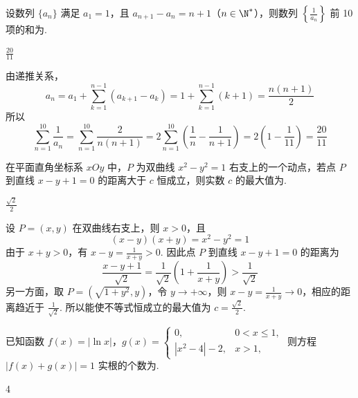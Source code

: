 \begin{problem}
设数列 \(\{a_n\}\) 满足 \(a_1 = 1\)，且 \(a_{n+1} - a_n = n + 1\)（\(n \in \N^*\)），则数列 \(\left\{\frac{1}{a_n}\right\}\) 前 10 项的和为\fillinblank{}.
\end{problem}

\begin{answer}
\(\frac{20}{11}\)
\end{answer}

\begin{solution}
由递推关系，
\[
a_n=a_1+\sum_{k=1}^{n-1}(a_{k+1}-a_k)=1+\sum_{k=1}^{n-1}(k+1)=\frac{n(n+1)}{2}
\]
所以
\[
\sum_{n=1}^{10}\frac{1}{a_n}=\sum_{n=1}^{10}\frac{2}{n(n+1)}=2\sum_{n=1}^{10}\left(\frac1n-\frac1{n+1}\right)=2\left(1-\frac1{11}\right)=\frac{20}{11}
\]
\end{solution}

\begin{problem}
在平面直角坐标系 \(xOy\) 中，\(P\) 为双曲线 \(x^{2} - y^{2} = 1\) 右支上的一个动点，若点 \(P\) 到直线 \(x - y + 1 = 0\) 的距离大于 \(c\) 恒成立，则实数 \(c\) 的最大值为\fillinblank{}.
\end{problem}

\begin{answer}
\(\frac{\sqrt{2}}{2}\)
\end{answer}

\begin{solution}
设 \(P=(x,y)\) 在双曲线右支上，则 \(x>0\)，且
\[
(x-y)(x+y)=x^{2}-y^{2}=1
\]
由于 \(x+y>0\)，有 \(x-y=\frac{1}{x+y}>0\). 因此点 \(P\) 到直线 \(x-y+1=0\) 的距离为
\[
\frac{x-y+1}{\sqrt2}=\frac{1}{\sqrt2}\left(1+\frac{1}{x+y}\right)>\frac{1}{\sqrt2}
\]
另一方面，取 \(P=(\sqrt{1+y^{2}},y)\)，令 \(y\to+\infty\)，则 \(x-y=\frac{1}{x+y}\to0\)，相应的距离趋近于 \(\frac{1}{\sqrt2}\). 所以能使不等式恒成立的最大值为 \(c=\frac{\sqrt2}{2}\).
\end{solution}

\begin{problem}
已知函数 \(f(x) = |\ln x|\)，\(g(x) = \begin{cases}
0, & 0 < x \leqslant 1,\\
|x^2 - 4| - 2, & x > 1,
\end{cases}\) 则方程 \(|f(x) + g(x)| = 1\) 实根的个数为\fillinblank{}.
\end{problem}

\begin{answer}
4
\end{answer}


